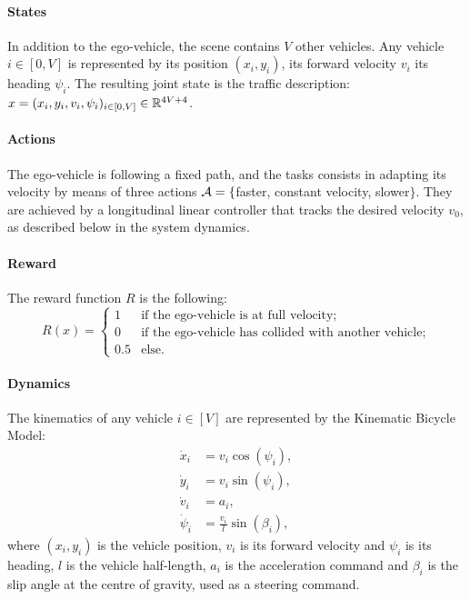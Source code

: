 \documentclass{article}
\begin{document}
\paragraph{States}

In addition to the ego-vehicle, the scene contains $V$ other vehicles. Any vehicle $i\in[0,V]$ is represented by its position $(x_i, y_i)$, its forward velocity $v_i$ its heading $\psi_i$. The resulting joint state is the traffic description: $x = (x_i, y_i, v_i, \psi_i)_{i\in[0,V]}\in\mathbb{R}^{4V+4}$.

\paragraph{Actions}

The ego-vehicle is following a fixed path, and the tasks consists in adapting its velocity by means of three actions $\mathcal{A} = \{$faster, constant velocity, slower$\}$. They are achieved by a longitudinal linear controller that tracks the desired velocity $v_0$, as described below in the system dynamics.

\paragraph{Reward}

The reward function $R$ is the following:
\[
R(x) = 
\begin{cases}
1 & \text{if the ego-vehicle is at full velocity;}\\
0 & \text{if the ego-vehicle has collided with another vehicle;}\\
0.5 & \text{else.}
\end{cases}\]

\paragraph{Dynamics}

The kinematics of any vehicle $i\in[V]$ are represented by the Kinematic Bicycle Model:
\begin{align}
\dot{x}_i &= v_i\cos(\psi_i), \nonumber\\
\dot{y}_i &= v_i\sin(\psi_i), \nonumber\\
\dot{v}_i &= a_i, \nonumber\\
\dot{\psi}_i &= \frac{v_i}{l}\sin(\beta_i), \nonumber
\end{align}
where $(x_i, y_i)$ is the vehicle position, $v_i$ is its forward velocity and $\psi_i$ is its heading, $l$ is the vehicle half-length, $a_i$ is the acceleration command and $\beta_i$ is the slip angle at the centre of gravity, used as a steering command.
\end{document}
